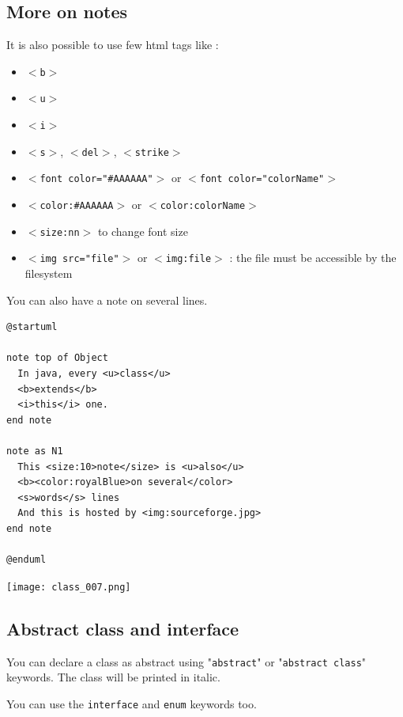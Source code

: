 \newpage \subsection{More on notes}

It is also possible to use few html tags like :
\begin{itemize}
\item \texttt{$<$b$>$}
\item \texttt{$<$u$>$}
\item \texttt{$<$i$>$}
\item \texttt{$<$s$>$}, \texttt{$<$del$>$}, \texttt{$<$strike$>$}
\item \texttt{$<$font color="\#AAAAAA"$>$} or \texttt{$<$font
color="colorName"$>$}
\item \texttt{$<$color:\#AAAAAA$>$} or \texttt{$<$color:colorName$>$}
\item \texttt{$<$size:nn$>$} to change font size
\item \texttt{$<$img src="file"$>$} or \texttt{$<$img:file$>$} : the file
must be accessible by the filesystem
\end{itemize}

You can also have a note on several lines.

\begin{lstlisting}
@startuml

note top of Object
  In java, every <u>class</u>
  <b>extends</b>
  <i>this</i> one.
end note

note as N1
  This <size:10>note</size> is <u>also</u>
  <b><color:royalBlue>on several</color>
  <s>words</s> lines
  And this is hosted by <img:sourceforge.jpg>
end note

@enduml
\end{lstlisting}
\begin{center}
\texttt{[image: class\_007.png]}
\end{center}

\newpage \subsection{Abstract class and interface}

You can declare a class as abstract using "\texttt{abstract}" or
"\texttt{abstract class}" keywords. The class will be printed in italic.

You can use the \texttt{interface} and \texttt{enum} keywords too.

